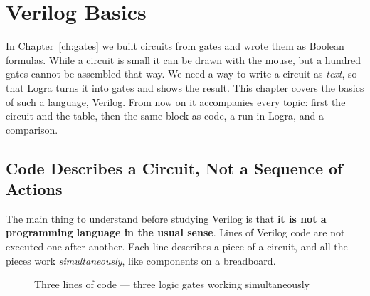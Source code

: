 \chapter{Verilog Basics}
\label{ch:verilog}

In Chapter~\ref{ch:gates} we built circuits from gates and wrote them as Boolean
formulas. While a circuit is small it can be drawn with the mouse, but a hundred
gates cannot be assembled that way. We need a way to write a circuit as
\emph{text}, so that Logra turns it into gates and shows the result. This
chapter covers the basics of such a language, Verilog. From now on it
accompanies every topic: first the circuit and the table, then the same block as
code, a run in Logra, and a comparison.

\section{Code Describes a Circuit, Not a Sequence of Actions}

The main thing to understand before studying Verilog is that \textbf{it is not a
programming language in the usual sense}. Lines of Verilog code are not executed
one after another. Each line describes a piece of a circuit, and all the pieces
work \emph{simultaneously}, like components on a breadboard.

\begin{figure}[H]
\centering
{}
\caption{Three lines of code --- three logic gates working simultaneously}
\label{fig:code_to_schem}
\end{figure}

